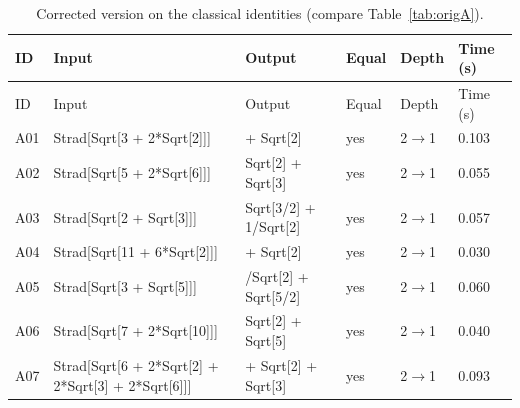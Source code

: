 \begin{longtable}{@{}p{}>{\ttfamily\footnotesize\raggedright\arraybackslash}p{}>{\ttfamily\footnotesize\raggedright\arraybackslash}p{}p{}p{}p{}@{}}
\caption{Corrected version on the classical identities (compare Table~\ref{tab:origA}).}\label{tab:fixedA}\\
\toprule ID & Input & Output & Equal & Depth & Time (s)\\\midrule\endfirsthead
\toprule ID & Input & Output & Equal & Depth & Time (s)\\\midrule\endhead
\bottomrule\endfoot
A01 & Strad[\allowbreak{}Sqrt[\allowbreak{}3 +\allowbreak{} 2*\allowbreak{}Sqrt[\allowbreak{}2]\allowbreak{}]\allowbreak{}]\allowbreak{} & 1 +\allowbreak{} Sqrt[\allowbreak{}2]\allowbreak{} & yes & 2$\to$1 & 0.103\\
A02 & Strad[\allowbreak{}Sqrt[\allowbreak{}5 +\allowbreak{} 2*\allowbreak{}Sqrt[\allowbreak{}6]\allowbreak{}]\allowbreak{}]\allowbreak{} & Sqrt[\allowbreak{}2]\allowbreak{} +\allowbreak{} Sqrt[\allowbreak{}3]\allowbreak{} & yes & 2$\to$1 & 0.055\\
A03 & Strad[\allowbreak{}Sqrt[\allowbreak{}2 +\allowbreak{} Sqrt[\allowbreak{}3]\allowbreak{}]\allowbreak{}]\allowbreak{} & Sqrt[\allowbreak{}3/\allowbreak{}2]\allowbreak{} +\allowbreak{} 1/\allowbreak{}Sqrt[\allowbreak{}2]\allowbreak{} & yes & 2$\to$1 & 0.057\\
A04 & Strad[\allowbreak{}Sqrt[\allowbreak{}11 +\allowbreak{} 6*\allowbreak{}Sqrt[\allowbreak{}2]\allowbreak{}]\allowbreak{}]\allowbreak{} & 3 +\allowbreak{} Sqrt[\allowbreak{}2]\allowbreak{} & yes & 2$\to$1 & 0.030\\
A05 & Strad[\allowbreak{}Sqrt[\allowbreak{}3 +\allowbreak{} Sqrt[\allowbreak{}5]\allowbreak{}]\allowbreak{}]\allowbreak{} & 1/\allowbreak{}Sqrt[\allowbreak{}2]\allowbreak{} +\allowbreak{} Sqrt[\allowbreak{}5/\allowbreak{}2]\allowbreak{} & yes & 2$\to$1 & 0.060\\
A06 & Strad[\allowbreak{}Sqrt[\allowbreak{}7 +\allowbreak{} 2*\allowbreak{}Sqrt[\allowbreak{}10]\allowbreak{}]\allowbreak{}]\allowbreak{} & Sqrt[\allowbreak{}2]\allowbreak{} +\allowbreak{} Sqrt[\allowbreak{}5]\allowbreak{} & yes & 2$\to$1 & 0.040\\
A07 & Strad[\allowbreak{}Sqrt[\allowbreak{}6 +\allowbreak{} 2*\allowbreak{}Sqrt[\allowbreak{}2]\allowbreak{} +\allowbreak{} 2*\allowbreak{}Sqrt[\allowbreak{}3]\allowbreak{} +\allowbreak{} 2*\allowbreak{}Sqrt[\allowbreak{}6]\allowbreak{}]\allowbreak{}]\allowbreak{} & 1 +\allowbreak{} Sqrt[\allowbreak{}2]\allowbreak{} +\allowbreak{} Sqrt[\allowbreak{}3]\allowbreak{} & yes & 2$\to$1 & 0.093\\

\end{longtable}
